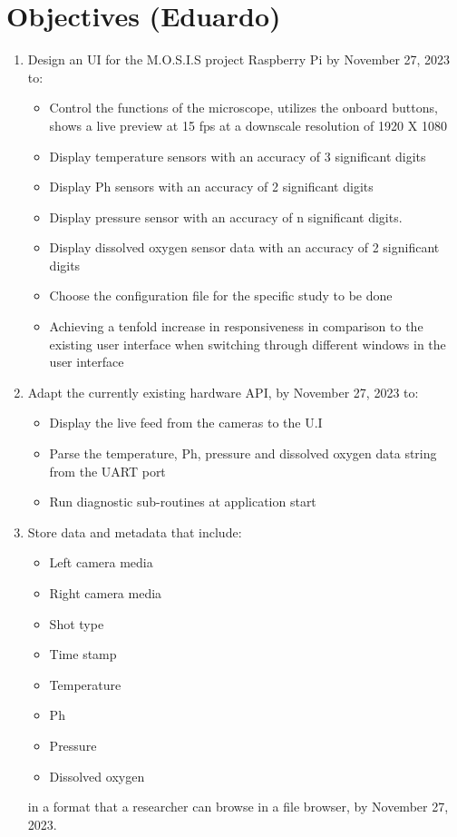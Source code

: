 \section{Objectives (Eduardo)}
\begin{enumerate}
    \item Design an UI for the M.O.S.I.S project Raspberry Pi by November 27, 2023 to:
    \begin{itemize}
        \item Control the functions of the microscope, utilizes the onboard buttons, shows a live preview at 15 fps at a downscale resolution of 1920 X 1080
        \item Display temperature sensors with an accuracy of 3 significant digits
        \item Display Ph sensors with an accuracy of 2 significant digits
        \item Display pressure sensor with an accuracy of n significant digits.
        \item Display dissolved oxygen sensor data with an accuracy of 2 significant digits
        \item Choose the configuration file for the specific study to be done
        \item Achieving a tenfold increase in responsiveness in comparison to the existing user interface when switching through different windows in the user interface
    \end{itemize} 
    \item Adapt the currently existing hardware API, by November 27, 2023 to:
    \begin{itemize}
        \item Display the live feed from the cameras to the U.I 
        \item Parse the temperature, Ph, pressure and dissolved oxygen data string from the UART port
        \item Run diagnostic sub-routines at application start
    \end{itemize}
    \item Store data and metadata that include:
    \begin{itemize}
        \item Left camera media
        \item Right camera media
        \item Shot type
        \item Time stamp
        \item Temperature
        \item Ph
        \item Pressure
        \item Dissolved oxygen
    \end{itemize}
    in a format that a researcher can browse in a file browser, by November 27, 2023.
\end{enumerate}